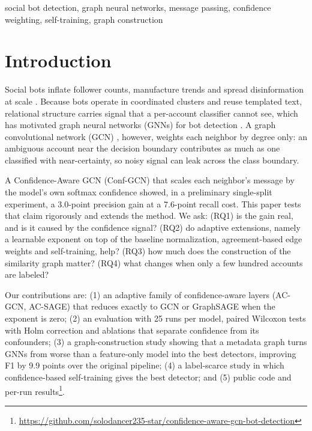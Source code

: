 \documentclass[conference,a4paper]{IEEEtran}
\begin{document}
\begin{IEEEkeywords}
social bot detection, graph neural networks, message passing, confidence weighting, self-training, graph construction
\end{IEEEkeywords}

\section{Introduction}
Social bots inflate follower counts, manufacture trends and spread disinformation at scale \cite{cresci2020decade}. Because bots operate in coordinated clusters and reuse templated text, relational structure carries signal that a per-account classifier cannot see, which has motivated graph neural networks (GNNs) for bot detection \cite{alhosseini2019detect,feng2021botrgcn,feng2022rgt}. A graph convolutional network (GCN) \cite{kipf2017gcn}, however, weights each neighbor by degree only: an ambiguous account near the decision boundary contributes as much as one classified with near-certainty, so noisy signal can leak across the class boundary.

A Confidence-Aware GCN (Conf-GCN) that scales each neighbor's message by the model's own softmax confidence showed, in a preliminary single-split experiment, a 3.0-point precision gain at a 7.6-point recall cost. This paper tests that claim rigorously and extends the method. We ask: (RQ1) is the gain real, and is it caused by the confidence signal? (RQ2) do adaptive extensions, namely a learnable exponent on top of the baseline normalization, agreement-based edge weights and self-training, help? (RQ3) how much does the construction of the similarity graph matter? (RQ4) what changes when only a few hundred accounts are labeled?

Our contributions are: (1) an adaptive family of confidence-aware layers (AC-GCN, AC-SAGE) that reduces exactly to GCN or GraphSAGE when the exponent is zero; (2) an evaluation with 25 runs per model, paired Wilcoxon tests with Holm correction and ablations that separate confidence from its confounders; (3) a graph-construction study showing that a metadata graph turns GNNs from worse than a feature-only model into the best detectors, improving F1 by 9.9 points over the original pipeline; (4) a label-scarce study in which confidence-based self-training gives the best detector; and (5) public code and per-run results\footnote{\url{https://github.com/solodancer235-star/confidence-aware-gcn-bot-detection}}.
\end{document}
